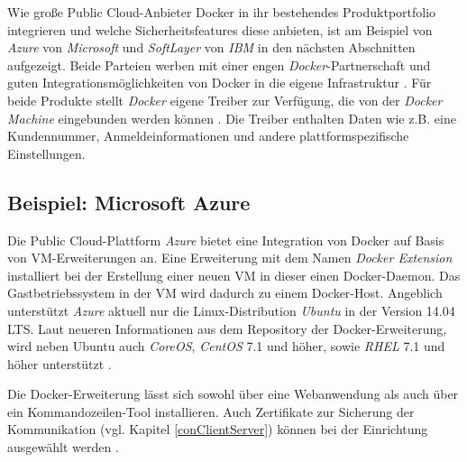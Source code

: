 \documentclass[../main.tex]{subfiles}
\begin{document}
    Wie große Public Cloud-Anbieter Docker in ihr bestehendes Produktportfolio integrieren und welche Sicherheitsfeatures diese anbieten, ist am Beispiel von \emph{Azure} von \emph{Microsoft} und \emph{SoftLayer} von \emph{IBM} in den nächsten Abschnitten aufgezeigt. Beide Parteien werben mit einer engen \emph{Docker}-Partnerschaft und guten Integrationsmöglichkeiten von Docker in die eigene Infrastruktur \cite{https://www.docker.com/microsoft}\cite{https://www.docker.com/IBM}. Für beide Produkte stellt \emph{Docker} eigene Treiber zur Verfügung, die von der \emph{Docker Machine} eingebunden werden können
    \cite{https://docs.docker.com/machine/drivers/}. Die Treiber enthalten Daten wie z.B. eine Kundennummer, Anmeldeinformationen und andere plattformspezifische Einstellungen.

    \subsection{Beispiel: Microsoft Azure}
      Die Public Cloud-Plattform \emph{Azure} bietet eine Integration von Docker auf Basis von VM-Erweiterungen an. Eine Erweiterung mit dem Namen \emph{Docker Extension} installiert bei der Erstellung einer neuen VM in dieser einen Docker-Daemon. Das Gastbetriebssystem in der VM wird dadurch zu einem Docker-Host. Angeblich unterstützt \emph{Azure} aktuell nur die Linux-Distribution \emph{Ubuntu} in der Version 14.04 \acrshort{LTS}. Laut neueren Informationen aus dem Repository der Docker-Erweiterung, wird neben Ubuntu auch \emph{CoreOS}, \emph{CentOS} 7.1 und höher, sowie \emph{\acrshort{RHEL}} 7.1 und höher unterstützt \cite{https://github.com/Azure/azure-docker-extension/blob/032b0086397155d22f27639aca3b6016b0dfbef4/README.md}.


      Die Docker-Erweiterung lässt sich sowohl über eine Webanwendung als auch über ein Kommandozeilen-Tool installieren. Auch Zertifikate zur Sicherung der Kommunikation (vgl. Kapitel \ref{conClientServer}) können bei der Einrichtung ausgewählt werden \cite{https://azure.microsoft.com/de-de/documentation/articles/virtual-machines-docker-vm-extension/}\cite{https://azure.microsoft.com/en-us/documentation/articles/virtual-machines-docker-with-xplat-cli/}.
\end{document}
